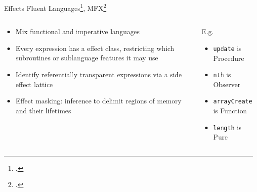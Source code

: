 \documentclass[aspectratio=169]{beamer}
\begin{document}
\begin{frame}{Effects}
    Fluent Languages\footcite{gifford_integrating_1986}, MFX\footcite{lucassen_polymorphic_1988}
  \begin{columns}[T]
    \begin{column}{0.68\textwidth}
        \begin{itemize}[<+->]
            \item Mix functional and imperative languages 
            \item Every expression has a \alert{effect class}, restricting which subroutines or sublanguage features it may use
            \item Identify \alert{referentially transparent} expressions via a side effect lattice 
            \item Effect masking: inference to delimit regions of memory and their lifetimes
        \end{itemize}
    \end{column}

    \pause

    \begin{column}{0.30\textwidth}
    \vspace{-0.2in}
    \footnotesize{

    \vspace{0.1in}
    \pause
    E.g.
    \begin{itemize}
        \item \texttt{update} is Procedure
        \item \texttt{nth} is Observer
        \item \texttt{arrayCreate} is Function
        \item \texttt{length} is Pure
    \end{itemize}
    }
    \end{column}
  \end{columns}
  \vspace{-0.3in}
\end{frame}
\end{document}

